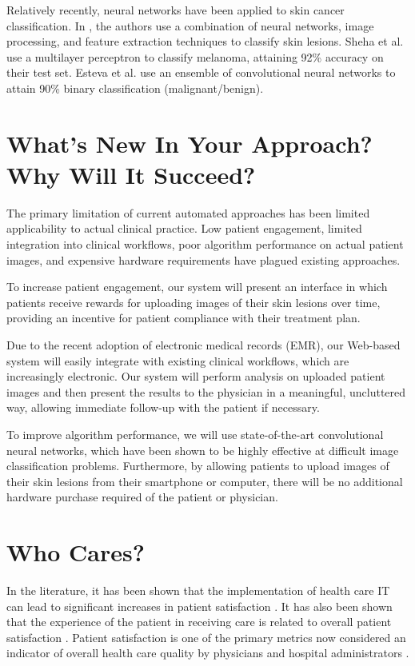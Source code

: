 \documentclass[a4paper,10pt]{article}
\begin{document}
Relatively recently, neural networks have been applied to skin cancer
classification. In \cite{Kreutz2001}, the authors use a combination of neural
networks, image processing, and feature extraction techniques to classify
skin lesions. Sheha et al. \cite{Sheha_automaticdetection} use a multilayer
perceptron to classify melanoma, attaining 92\% accuracy on their test set.
Esteva et al. \cite{esteva-skincancer-manuscript} use an ensemble of
convolutional neural networks to attain 90\% binary classification
(malignant/benign).

\section{What's New In Your Approach? Why Will It Succeed?}
The primary limitation of current automated approaches has been limited
applicability to actual clinical practice. Low patient engagement, limited
integration into clinical workflows, poor algorithm performance on actual
patient images, and expensive hardware requirements have plagued existing
approaches.

To increase patient engagement, our system will present an interface in which
patients receive rewards for uploading images of their skin lesions
over time, providing an incentive for patient compliance with their treatment
plan.

Due to the recent adoption of electronic medical records (EMR), our Web-based
system will easily integrate with existing clinical workflows, which are
increasingly electronic. Our system will perform analysis on uploaded patient
images and then present the results to the physician in a meaningful,
uncluttered way, allowing immediate follow-up with the patient if necessary.

To improve algorithm performance, we will use state-of-the-art convolutional
neural networks, which have been shown to be highly effective
\cite{krizhevsky2012imagenet} at difficult image classification problems.
Furthermore, by allowing patients to upload images of their skin lesions from
their smartphone or computer, there will be no additional hardware purchase
required of the patient or physician.

\section{Who Cares?}
In the literature, it has been shown that the implementation of health care
IT can lead to significant increases in patient satisfaction
\cite{roham2012predicting}. It has also been shown that the experience of the
patient in receiving care is related to overall patient
satisfaction \cite{bjertnaes2012overall}. Patient satisfaction is one of the
primary metrics now considered an indicator of overall health care quality by
physicians and hospital administrators \cite{fenton2012cost}.
\end{document}
